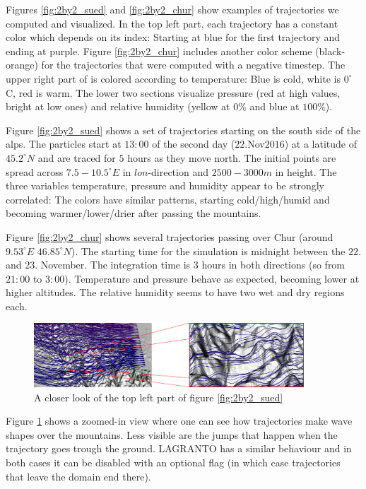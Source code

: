 
Figures \ref{fig:2by2_sued} and \ref{fig:2by2_chur} show examples of trajectories we computed and visualized. In the top left part, each trajectory has a constant color which depends on its index: Starting at blue for the first trajectory and ending at purple. Figure \ref{fig:2by2_chur} includes another color scheme (black-orange) for the trajectories that were computed with a negative timestep. The upper right part of is colored according to temperature: Blue is cold, white is $0^{\circ}$C, red is warm. The lower two sections visualize pressure (red at high values, bright at low ones) and relative humidity (yellow at $0 \%$ and blue at $100 \%$).

Figure \ref{fig:2by2_sued} shows a set of trajectories starting on the south side of the alps. The particles start at $13:00$ of the second day ($22. $Nov$ 2016$) at a latitude of $45.2 ^{\circ} N$ and are traced for $5$ hours as they move north. The initial points are spread across $7.5 - 10.5 ^{\circ} E$ in $lon$-direction and $2500 - 3000 m$ in height. The three variables temperature, pressure and humidity appear to be strongly correlated: The colors have similar patterns, starting cold/high/humid and becoming warmer/lower/drier after passing the mountains.

Figure \ref{fig:2by2_chur} shows several trajectories passing over Chur (around $9.53 ^{\circ}E$ $46.85^{\circ} N$). The starting time for the simulation is midnight between the $22.$ and $23.$ November. The integration time is $3$ hours in both directions (so from $21:00$ to $3:00$). Temperature and pressure behave as expected, becoming lower at higher altitudes. The relative humidity seems to have two wet and dry regions each.

\begin{figure}
\centering \includegraphics*[width=0.9\textwidth]{figures/0627_zooming}
\caption{A closer look of the top left part of figure \ref{fig:2by2_sued}}
\label{fig:zooming}
\end{figure}
Figure \ref{fig:zooming} shows a zoomed-in view where one can see how trajectories make wave shapes over the mountains. Less visible are the jumps that happen when the trajectory goes trough the ground. LAGRANTO has a similar behaviour and in both cases it can be disabled with an optional flag (in which case trajectories that leave the domain end there).

